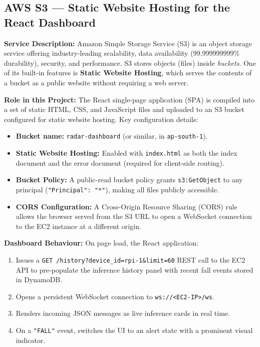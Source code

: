 \subsection{AWS S3 --- Static Website Hosting for the React Dashboard}

\textbf{Service Description:} Amazon Simple Storage Service (S3) is an object storage service offering industry-leading scalability, data availability (99.999999999\% durability), security, and performance. S3 stores objects (files) inside \textit{buckets}. One of its built-in features is \textbf{Static Website Hosting}, which serves the contents of a bucket as a public website without requiring a web server.

\textbf{Role in this Project:} The React single-page application (SPA) is compiled into a set of static HTML, CSS, and JavaScript files and uploaded to an S3 bucket configured for static website hosting. Key configuration details:

\begin{itemize}
    \item \textbf{Bucket name:} \texttt{radar-dashboard} (or similar, in \texttt{ap-south-1}).
    \item \textbf{Static Website Hosting:} Enabled with \texttt{index.html} as both the index document and the error document (required for client-side routing).
    \item \textbf{Bucket Policy:} A public-read bucket policy grants \texttt{s3:GetObject} to any principal (\texttt{"Principal": "*"}), making all files publicly accessible.
    \item \textbf{CORS Configuration:} A Cross-Origin Resource Sharing (CORS) rule allows the browser served from the S3 URL to open a WebSocket connection to the EC2 instance at a different origin.
\end{itemize}

\textbf{Dashboard Behaviour:} On page load, the React application:
\begin{enumerate}
    \item Issues a \texttt{GET /history?device\_id=rpi-1\&limit=60} REST call to the EC2 API to pre-populate the inference history panel with recent fall events stored in DynamoDB.
    \item Opens a persistent WebSocket connection to \texttt{ws://<EC2-IP>/ws}.
    \item Renders incoming JSON messages as live inference cards in real time.
    \item On a \texttt{"FALL"} event, switches the UI to an alert state with a prominent visual indicator.
\end{enumerate}

